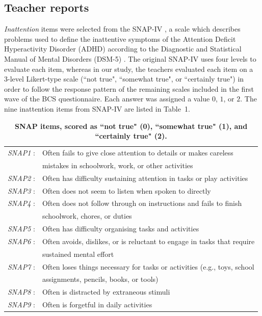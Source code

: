 \documentclass[10pt,letterpaper]{article}
\begin{document}
\vspace{3mm}
\subsection*{Teacher reports}
\emph{Inattention} items were selected from the SNAP-IV \cite{Swanson1992}, a scale which describes problems used to define the inattentive symptoms of the Attention Deficit Hyperactivity Disorder (ADHD) according to the Diagnostic and Statistical Manual of Mental Disorders (DSM-5) \cite{APA2013}. The original SNAP-IV uses four levels to evaluate each item, whereas in our study, the teachers evaluated each item on a 3-level Likert-type scale (``not true", ``somewhat true", or ``certainly true") in order to follow the response pattern of the remaining scales included in the first wave of the BCS questionnaire. Each answer was assigned a value $0$, $1$, or $2$. 
The  nine inattention items from SNAP-IV are listed in Table~1. 


\begin{table}[!ht]
\begin{adjustwidth}{-5mm}{0in} 
\centering
\caption{\bf SNAP items, scored as ``not true" (0), ``somewhat true" (1), and ``certainly true" (2).}
\vspace{5mm}
\begin{tabular}{|ll|}
\hline
{\it SNAP1} : & Often fails to give close attention to details or makes careless\\ & mistakes in schoolwork, work, or other activities\\ \hline
{\it SNAP2} : & Often has difficulty sustaining attention in tasks or play activities \\ \hline
{\it SNAP3} : & Often does not seem to listen when spoken to directly \\ \hline
{\it SNAP4} : & Often does not follow through on instructions and fails to finish\\ &  schoolwork, chores, or duties\\ \hline
{\it SNAP5} : & Often has difficulty organising tasks and activities \\ \hline
{\it SNAP6} : & Often avoids, dislikes, or is reluctant to engage in tasks that require\\ & sustained mental effort\\ \hline
{\it SNAP7} : & Often loses things necessary for tasks or activities (e.g., toys, school\\ &  assignments, pencils, books, or tools) \\ \hline
{\it SNAP8} : & Often is distracted by extraneous stimuli\\ \hline
{\it SNAP9} : & Often is forgetful in daily activities \\ \hline
\end{tabular}
\label{Table1}
\end{adjustwidth}
\end{table}
\end{document}
